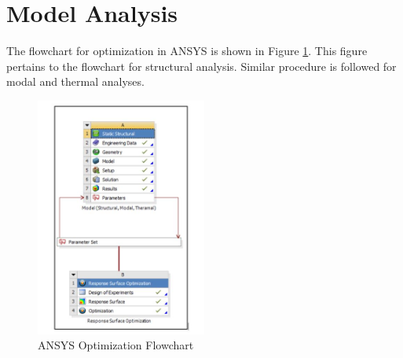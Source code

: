\documentclass[12pt]{article}
\begin{document}
\section{Model Analysis}
The flowchart for optimization in ANSYS is shown in Figure \ref{flow2}. This figure pertains to the flowchart for structural analysis. Similar procedure is followed for modal and thermal analyses.
\begin{figure}[H]
\begin{center}
\includegraphics[width=0.5\textwidth]{flow_ansys.jpg}
\caption{ANSYS Optimization Flowchart}
\label{flow2}
\end{center}
\end{figure}
\end{document}
